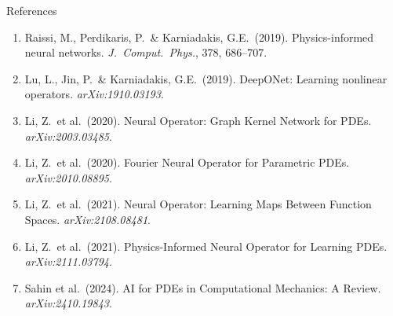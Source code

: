 \documentclass[aspectratio=169]{beamer}
\begin{document}
\begin{frame}{References}

  \footnotesize
  \begin{enumerate}
    \item Raissi, M., Perdikaris, P.\ \& Karniadakis, G.E.\ (2019).
      Physics-informed neural networks.
      \textit{J.\ Comput.\ Phys.}, 378, 686--707.

    \item Lu, L., Jin, P.\ \& Karniadakis, G.E.\ (2019).
      DeepONet: Learning nonlinear operators.
      \textit{arXiv:1910.03193}.

    \item Li, Z.\ et al.\ (2020).
      Neural Operator: Graph Kernel Network for PDEs.
      \textit{arXiv:2003.03485}.

    \item Li, Z.\ et al.\ (2020).
      Fourier Neural Operator for Parametric PDEs.
      \textit{arXiv:2010.08895}.

    \item Li, Z.\ et al.\ (2021).
      Neural Operator: Learning Maps Between Function Spaces.
      \textit{arXiv:2108.08481}.

    \item Li, Z.\ et al.\ (2021).
      Physics-Informed Neural Operator for Learning PDEs.
      \textit{arXiv:2111.03794}.

    \item Sahin et al.\ (2024).
      AI for PDEs in Computational Mechanics: A Review.
      \textit{arXiv:2410.19843}.
  \end{enumerate}

\end{frame}
\end{document}
